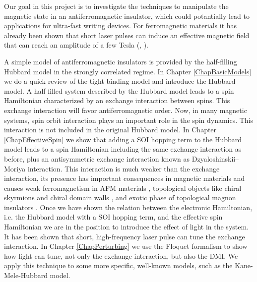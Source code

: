 Our goal in this project is to investigate the techniques to manipulate the magnetic state in an antiferromagnetic insulator, which could potantially lead to applications for ultra-fast writing devices. For ferromagnetic materials it has already been shown that short laser pulses can induce an effective magnetic field that can reach an amplitude of a few Tesla (\cite{Qaiumzadeh2016}, \cite{Qaiumzadeh2013}).

A simple model of antiferromagnetic insulators is provided by the half-filling Hubbard model in the strongly correlated regime. In Chapter \ref{ChapBasicModels} we do a quick review of the tight binding model and introduce the Hubbard model. A half filled system described by the Hubbard model leads to a spin Hamiltonian characterized by an exchange interaction between spins. This exchange interaction will favor antiferromagnetic order. Now, in many magnetic systems, spin orbit interaction plays an important role in the spin dynamics. This interaction is not included in the original Hubbard model. In Chapter \ref{ChapEffectiveSpin} we show that adding a SOI hopping term to the Hubbard model leads to a spin Hamiltonian including the same exchange interaction as before, plus an antisymmetric exchange interaction known as Dzyaloshinskii–Moriya interaction. This interaction is much weaker than the exchange interaction, its presence has important consequences in magnetic materials and causes weak ferromagnetism in AFM materials \cite{dzyaloshinsky1958, Moriya1960}, topological objects like chiral skyrmions \cite{muhlbauer2009,Fert2017,Alireza-DMI1,Alireza-DMI2} and chiral domain walls \cite{Thiaville2012,Parkin,AlirezaSW}, and exotic phase of topological magnon insulators \cite{Owerre2016,Elyasi2018,Chen2018,Owerre1,Owerre2}. Once we have shown the relation between the electronic Hamiltonian, i.e. the Hubbard model with a SOI hopping term, and the effective spin Hamiltonian we are in the position to introduce the effect of light in the system. It has been shown that short, high-frequency laser pulse can tune the exchange interaction\cite{Mentink2014,Itin2015,Mentink2015,Meyer2017,Stepanov2017,Kitamura2017,MentinkReview,Barbeau2018}. In Chapter \ref{ChapPerturbing} we use the Floquet formalism to show how light can tune, not only the exchange interaction, but also the DMI. We apply this technique to some more specific, well-known models, such as the Kane-Mele-Hubbard model.





















